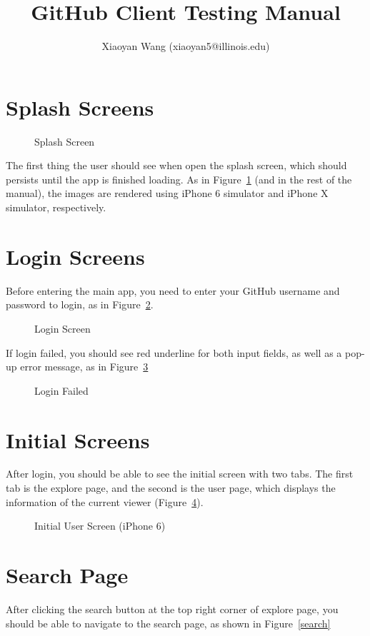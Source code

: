 \documentclass[12pt]{article}
\title{GitHub Client Testing Manual}
\author{Xiaoyan Wang (xiaoyan5@illinois.edu)}
\newcommand{\imgh}[4]{
    \begin{figure}[!htbp]%
    \begin{center}
    \subfloat{{\texttt{[image: \#2]} }}%
    \qquad
    \subfloat{{\texttt{[image: \#3]} }}%
    \caption{#4}\label{#2}
    \end{center}
\end{figure}
}
\begin{document}
\maketitle

\tableofcontents

\newcommand{\sectionbreak}{\clearpage}


\section{Splash Screens}

\imgh{0.45}{splash_screen}{splash_screen_iphoneX}{Splash Screen}

The first thing the user should see when open the splash screen, which should persists until the app is finished loading. As in Figure~\ref{splash_screen} (and in the rest of the manual), the images are rendered using iPhone 6 simulator and iPhone X simulator, respectively.

\section{Login Screens}

Before entering the main app, you need to enter your GitHub username and password to login, as in Figure~\ref{login}.

\imgh{0.45}{login}{login_iphoneX}{Login Screen}


If login failed, you should see red underline for both input fields, as well as a pop-up error message, as in Figure~\ref{login_fail}

\imgh{0.45}{login_fail}{login_fail_iphoneX}{Login Failed}


\section{Initial Screens}

After login, you should be able to see the initial screen with two tabs. The first tab is the explore page, and the second is the user page, which displays the information of the current viewer (Figure~\ref{initial_explore}).

\imgh{0.45}{initial_explore}{initial_user}{Initial User Screen (iPhone 6)}

\section{Search Page}

After clicking the search button at the top right corner of explore page, you should be able to navigate to the search page, as shown in Figure~\ref{search}
\end{document}
